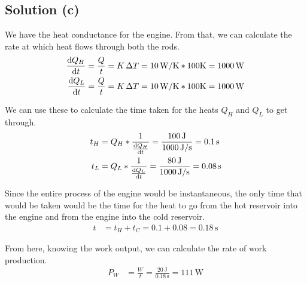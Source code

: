 \documentclass[12pt]{article}
\begin{document}
        \subsection{Solution (c)}
            We have the heat conductance for the engine. 
            From that, we can calculate the rate at which heat flows through both the rods. 
            \begin{align}
                \dv{Q_H}{t} &=  \frac{Q}{t}
                    =   K\,\Delta T
                    =   10\,\unit{\watt/\kelvin} * 100\unit{\kelvin}
                    =   1000\,\unit{\watt}\\
                \dv{Q_L}{t} &=  \frac{Q}{t}
                    =   K\,\Delta T
                    =   10\,\unit{\watt/\kelvin} * 100\unit{\kelvin}
                    =   1000\,\unit{\watt}
            \end{align}

            We can use these to calculate the time taken for the heats $Q_H$ and $Q_L$ to get through.
            \begin{align}
                t_H &=  Q_H * \frac{1}{\dv{Q_H}{t}}
                    =  \frac{100\,\unit{\joule}}{1000\,\unit{\joule/\second}}
                    =   0.1\,\unit{\second}
                    \\
                t_L &=  Q_L * \frac{1}{\dv{Q_L}{t}} 
                    =   \frac{80\,\unit{\joule}}{1000\,\unit{\joule/\second}}
                    =   0.08\,\unit{\second}
            \end{align}

            Since the entire process of the engine would be instantaneous, the only time that would be taken would be the time for the heat to go from the hot reservoir into the engine and from the engine into the cold reservoir.
            \begin{align}
                t   &=  t_H + t_C
                    =   0.1 + 0.08
                    =   0.18\,\unit{\second}
            \end{align}

            From here, knowing the work output, we can calculate the rate of work production.
            \begin{align}
                P_W &=  \frac{W}{t}
                    =   \frac{20\,\unit{\joule}}{0.18\,\unit{\second}}
                    =   \boxed{111\,\unit{\watt}}
            \end{align}
\end{document}

